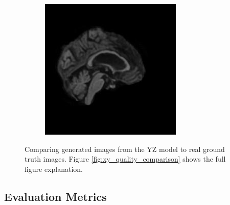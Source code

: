 \documentclass[12pt, fleqn, titlepage]{article}
\newcommand\skipperer{0.45pt}
\newcommand{\1}[1]{\mathds{1}\left[#1\right]}
\begin{document}
\begin{figure}[H]
\begin{subfigure}[b]{0.7\textwidth}
		\hskip\skipperer
		\includegraphics[width=0.22\linewidth]{imgs/082_S_0469/ALL_model_082_S_0469_yz_3}
	\end{subfigure}
	\caption{Comparing generated images from the YZ model to real ground truth images. Figure \ref{fig:xy_quality_comparison} shows the full figure explanation.}
	\label{fig:all_quality_comparison}
\end{figure}


\subsection{Evaluation Metrics}\label{result_evaluation_metrics}
\end{document}
